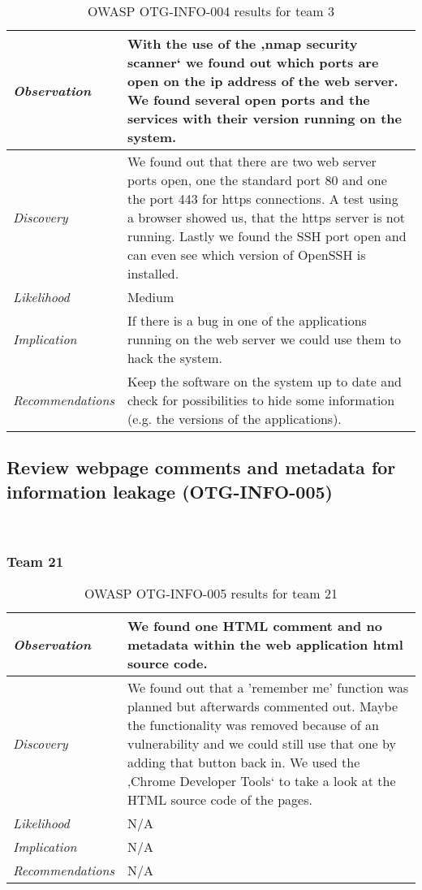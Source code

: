 \documentclass[headsepline,footsepline,footinclude=false,oneside,fontsize=11pt,paper=a4,listof=totoc,bibliography=totoc]{scrbook} %
\begin{document}
\begin{table}[H]
\centering
 \begin{tabular}{l p{11cm}} 
 \textit{Observation} & With the use of the ‚nmap security scanner‘ we found out which ports are open on the ip address of the web server. We found several open ports and the services with their version running on the system.\\ 
 \hline
 \textit{Discovery} & We found out that there are two web server ports open, one the standard port 80 and one the port 443 for https connections. A test using a browser showed us, that the https server is not running. Lastly we found the SSH port open and can even see which version of OpenSSH is installed. \\
 \hline
 \textit{Likelihood} & Medium\\
 \hline
 \textit{Implication} & If there is a bug in one of the applications running on the web server we could use them to hack the system.\\
 \hline
 \textit{Recommendations} & Keep the software on the system up to date and check for possibilities to hide some information (e.g. the versions of the applications). \\ 
\end{tabular}
\caption{OWASP OTG-INFO-004 results for team 3}
\label{table:scenario2}
\end{table}

\subsection{Review webpage comments and metadata for information leakage (OTG-INFO-005)}\

\subsubsection{Team 21}

\begin{table}[H]
\centering
 \begin{tabular}{l p{11cm}} 
 \textit{Observation} & We found one HTML comment and no metadata within the web application html source code.\\ 
 \hline
 \textit{Discovery} & We found out that a 'remember me' function was planned but afterwards commented out. Maybe the functionality was removed because of an vulnerability and we could still use that one by adding that button back in. We used the ‚Chrome Developer Tools‘ to take a look at the HTML source code of the pages. \\
 \hline
 \textit{Likelihood} & N/A\\
 \hline
 \textit{Implication} & N/A\\
 \hline
 \textit{Recommendations} & N/A\\ 
\end{tabular}
\caption{OWASP OTG-INFO-005 results for team 21}
\label{table:scenario2}
\end{table}
\end{document}
